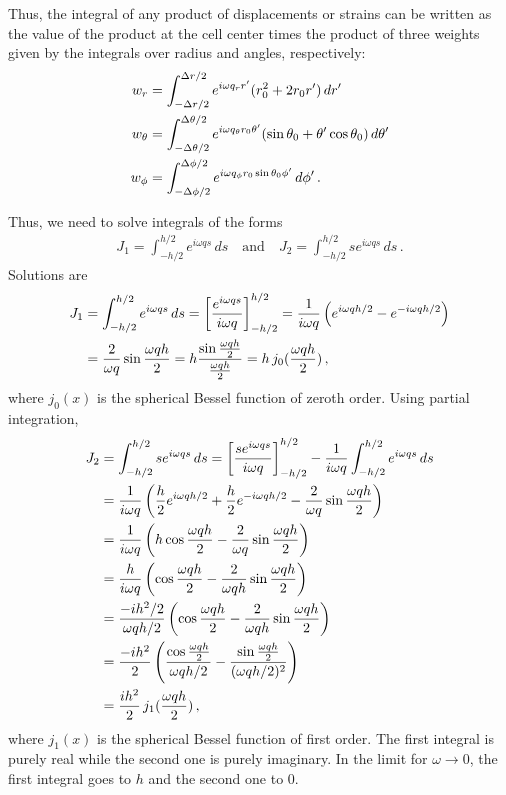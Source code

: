 %
Thus, the integral of any product of displacements or strains can be written as the value of the product at the cell center times the product of three weights given by the integrals over radius and angles, respectively:
%
\begin{align}
   w_r &= \int_{-\Delta r/2}^{\Delta r/2}e^{i\omega q_r r'}(r_0^2+2r_0 r')\,dr' \notag \\
   w_\theta &= \int_{-\Delta \theta/2}^{\Delta \theta/2}e^{i\omega q_\theta r_0\theta'}(\sin\theta_0+\theta'\cos\theta_0)\,d\theta' \notag \\
   w_\phi &= \int_{-\Delta \phi/2}^{\Delta \phi/2} e^{i\omega q_\phi r_0\sin\theta_0\phi'}\,d\phi'\,.
\end{align}
%

Thus, we need to solve integrals of the forms
%
\begin{align}
J_1 =  \int_{-h/2}^{h/2}e^{i\omega q s}\,ds \quad\mathrm{and}\quad J_2 = \int_{-h/2}^{h/2}s e^{i\omega q s}\,ds \,.
\end{align}
%
Solutions are
%
\begin{align}
J_1 &= \int_{-h/2}^{h/2}e^{i\omega q s}\,ds = \left[\frac{e^{i\omega q s}}{i\omega q}\right]_{-h/2}^{h/2} =
       \frac{1}{i\omega q}\left(e^{i\omega q h/2} - e^{-i\omega q h/2}\right) \notag \\
    &= \frac{2}{\omega q}\sin\frac{\omega qh}{2} =  h\frac{\sin\frac{\omega qh}{2}}{\frac{\omega qh}{2}} = h\,j_0(\frac{\omega qh}{2}) \,,
\end{align}
%
where $j_0(x)$ is the spherical Bessel function of zeroth order. Using partial integration,
%
\begin{align}
J_2 &= \int_{-h/2}^{h/2}s e^{i\omega q s}\,ds =
       \left[\frac{s e^{i\omega q s}}{i\omega q}\right]_{-h/2}^{h/2}-\frac{1}{i\omega q}\int_{-h/2}^{h/2}e^{i\omega q s}\,ds \notag \\
    &= \frac{1}{i\omega q}\left(\frac{h}{2}e^{i\omega q h/2} + \frac{h}{2}e^{-i\omega q h/2}
       -\frac{2}{\omega q}\sin\frac{\omega qh}{2}\right) \notag \\
    &= \frac{1}{i\omega q}\left(h\cos\frac{\omega q h}{2}-\frac{2}{\omega q}\sin\frac{\omega qh}{2}\right) \notag \\
    &= \frac{h}{i\omega q}\left(\cos\frac{\omega q h}{2}-\frac{2}{\omega qh}\sin\frac{\omega qh}{2}\right) \notag \\
    &= \frac{-ih^2/2}{\omega qh/2}\left(\cos\frac{\omega q h}{2}-\frac{2}{\omega qh}\sin\frac{\omega qh}{2}\right) \notag \\
    &= \frac{-ih^2}{2}\left(\frac{\cos\frac{\omega q h}{2}}{\omega qh/2}-\frac{\sin\frac{\omega qh}{2}}{(\omega qh/2)^2}\right) \notag \\
    &= \frac{ih^2}{2}\,j_1(\frac{\omega q h}{2}) \,,
\end{align}
%
where $j_1(x)$ is the spherical Bessel function of first order.
The first integral is purely real while the second one is purely imaginary. In the limit for $\omega\to 0$, the first integral goes to $h$ and the second one to $0$.

